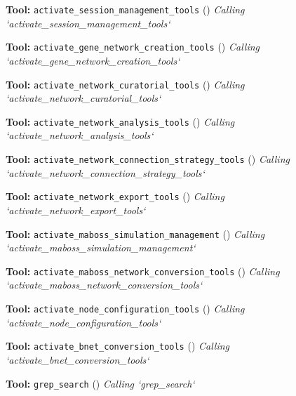\documentclass[11pt,a4paper]{article}
\begin{document}
\begin{toolokbox}
\textbf{Tool:} \texttt{activate\_session\_management\_tools} (\checkmark)
\textit{Calling `activate\_session\_management\_tools`}
\end{toolokbox}
\begin{toolokbox}
\textbf{Tool:} \texttt{activate\_gene\_network\_creation\_tools} (\checkmark)
\textit{Calling `activate\_gene\_network\_creation\_tools`}
\end{toolokbox}
\begin{toolokbox}
\textbf{Tool:} \texttt{activate\_network\_curatorial\_tools} (\checkmark)
\textit{Calling `activate\_network\_curatorial\_tools`}
\end{toolokbox}
\begin{toolokbox}
\textbf{Tool:} \texttt{activate\_network\_analysis\_tools} (\checkmark)
\textit{Calling `activate\_network\_analysis\_tools`}
\end{toolokbox}
\begin{toolokbox}
\textbf{Tool:} \texttt{activate\_network\_connection\_strategy\_tools} (\checkmark)
\textit{Calling `activate\_network\_connection\_strategy\_tools`}
\end{toolokbox}
\begin{toolokbox}
\textbf{Tool:} \texttt{activate\_network\_export\_tools} (\checkmark)
\textit{Calling `activate\_network\_export\_tools`}
\end{toolokbox}
\begin{toolokbox}
\textbf{Tool:} \texttt{activate\_maboss\_simulation\_management} (\checkmark)
\textit{Calling `activate\_maboss\_simulation\_management`}
\end{toolokbox}
\begin{toolokbox}
\textbf{Tool:} \texttt{activate\_maboss\_network\_conversion\_tools} (\checkmark)
\textit{Calling `activate\_maboss\_network\_conversion\_tools`}
\end{toolokbox}
\begin{toolokbox}
\textbf{Tool:} \texttt{activate\_node\_configuration\_tools} (\checkmark)
\textit{Calling `activate\_node\_configuration\_tools`}
\end{toolokbox}
\begin{toolokbox}
\textbf{Tool:} \texttt{activate\_bnet\_conversion\_tools} (\checkmark)
\textit{Calling `activate\_bnet\_conversion\_tools`}
\end{toolokbox}
\begin{toolokbox}
\textbf{Tool:} \texttt{grep\_search} (\checkmark)
\textit{Calling `grep\_search`}
\end{toolokbox}
\end{document}
